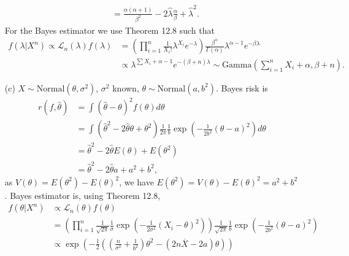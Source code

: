 \begin{itemize}
\begin{equation*}
\begin{split}
                &= \frac{\alpha(\alpha + 1)}{\beta^2} - 2\hat{\lambda} \frac{\alpha}{\beta} + \hat{\lambda}^2.
        \end{split}
    \end{equation*}
    For the Bayes estimator we use Theorem 12.8 such that
    \begin{equation*}
        \begin{split}
            f(\lambda|X^n) \propto \mathcal{L}_n(\lambda) f(\lambda)
                &= \left( \prod_{i = 1}^n \frac{1}{X_i!} \lambda^{X_i} e^{-\lambda} \right) \frac{\beta^{\alpha}}{\Gamma(\alpha)} \lambda^{\alpha - 1} e^{-\beta \lambda} \\
                &\propto \lambda^{\sum X_i + \alpha - 1} e^{-(\beta + n)\lambda}
                \sim \mathrm{Gamma}\left(\sum_{i = 1}^n X_i + \alpha, \beta + n\right).
        \end{split}
    \end{equation*}
\item[(c)] $X \sim \mathrm{Normal}(\theta, \sigma^2)$, $\sigma^2$ known, $\theta \sim \mathrm{Normal}(a, b^2)$.
    Bayes risk is
    \begin{equation*}
        \begin{split}
            r(f, \hat{\theta})
                &= \int (\hat{\theta} - \theta)^2 f(\theta) d\theta \\
                &= \int (\hat{\theta}^2 - 2 \hat{\theta} \theta + \theta^2) \frac{1}{2\pi} \frac{1}{b} \exp\left(-\frac{1}{2b^2} (\theta - a)^2\right) d\theta \\
                &= \hat{\theta}^2 - 2\hat{\theta} E(\theta) + E(\theta^2) \\
                &= \hat{\theta}^2 - 2 \hat{\theta} a + a^2 + b^2,
        \end{split}
    \end{equation*}
    as $V(\theta) = E(\theta^2) - E(\theta)^2$, we have $E(\theta^2) = V(\theta) - E(\theta)^2 = a^2 + b^2$.
    Bayes estimator is, using Theorem 12.8,
    \begin{equation*}
        \begin{split}
            f(\theta|X^n) &\propto \mathcal{L}_n(\theta) f(\theta) \\
                &= \left(\prod_{i = 1}^n \frac{1}{\sqrt{2 \pi}} \frac{1}{\sigma} \exp\left(-\frac{1}{2\sigma^2} (X_i - \theta)^2\right)\right) \frac{1}{\sqrt{2\pi}} \frac{1}{b} \exp\left(-\frac{1}{2b^2} (\theta - a)^2\right) \\
                &\propto \exp\left(-\frac{1}{2}\left(\left(\frac{n}{\sigma^2} + \frac{1}{b^2}\right) \theta^2 - (2n\overline{X} - 2a)\theta\right)\right) \\

\end{split}
\end{equation*}
\end{itemize}

